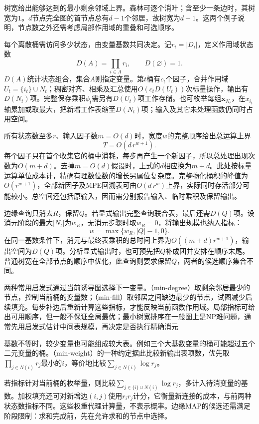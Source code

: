树宽给出能够达到的最小剩余邻域上界。森林可逐个消叶；含至少一条边时，其树宽为$1$。$d$节点完全图的首节点总有$d-1$个邻居，故树宽为$d-1$。这两个例子说明，节点数之外还需考虑局部作用域的重叠和可选顺序。

每个离散桶需访问多少状态，由变量基数共同决定。记$r_i=|D_i|$，定义作用域状态数
\[
  D(A)=\prod_{i\in A}r_i,\qquad D(\varnothing)=1.
\]
$D(A)$统计状态组合，集合$A$则指定变量。第$t$桶有$c_t$个因子，合并作用域$U_t=\{i_t\}\cup N_t$；稠密对齐、相乘及汇总使用$O(c_tD(U_t))$次标量操作，输出有$D(N_t)$项。完整保存乘积$\phi_t$需另有$D(U_t)$项工作存储。也可枚举每组$\bm{x}_{N_t}$，在$x_{i_t}$轴累加或取最大，把新增工作表缩至$D(N_t)$项；输入及其它未处理函数仍同时占用空间。

所有状态数至多$r$、输入因子数$m=O(d)$时，宽度$w$的完整顺序给出总运算上界
\begin{equation}
  T=O(d\,r^{w+1}).
  \label{eq:pgm-elimination-discrete-time}
\end{equation}
每个因子只在首个收集它的桶中消耗，每步再产生一个新因子，所以总处理出现次数为$O(m+d)$。去掉$m=O(d)$假设时，上式的$d$相应换为$m+d$。此处按标量运算单位成本计，精确有理数位数的增长另属位复杂度。完整物化桶积的峰值为$O(r^{w+1})$，全部新因子及MPE回溯表可由$O(d\,r^w)$上界，实际同时存活部分可能较小。总空间还包括原输入，因而需分别报告输入、临时乘积及保留输出。

边缘查询只消去$R$，保留$Q$。若显式输出完整查询联合表，最后还需$D(Q)$项。设消元阶段的最大$|N_t|$为$w_R$，无消元步骤时取$w_R=0$，将输出规模也纳入指标：
\[
  \bar w=\max\{w_R,|Q|-1,0\}.
\]
在同一基数条件下，消元与最终表乘积的总时间上界为$O((m+d)r^{\bar w+1})$，输出空间为$D(Q)$项。分析显式输出时，也可预先把$Q$补成团并安排在顺序末尾。普通树宽在全部节点的顺序中优化，此查询则要求保留$Q$，两者的候选顺序集合不同。

两种常用启发式通过当前诱导图选择下一变量。（min-degree）取剩余邻居最少的节点，控制当前桶的变量数；（min-fill）取邻居之间缺边最少的节点，试图减少后续填充。每步补边后重新计算这些指标，才能反映当前函数作用域。局部指标可给出可用顺序，但一般不保证全局最优；最小树宽排序在一般图上是NP难问题，通常先用启发式估计中间表规模，再决定是否执行精确消元

基数不等时，较少变量也可能组成较大表。例如三个大基数变量的桶可能超过五个二元变量的桶。（min-weight）的一种约定据此比较新输出表项数，优先取$\prod_{j\in N(i)}r_j$最小的$i$，等价地比较$\sum_{j\in N(i)}\log r_j$。

若指标针对当前桶的枚举量，则比较$\sum_{j\in\{i\}\cup N(i)}\log r_j$，多计入待消变量的基数。加权填充还可对新增边$(i,j)$使用$r_ir_j$计分，它衡量新连接的成本，与前两种状态数指标不同。这些权重代理计算量，不表示概率。边缘MAP的候选还需满足阶段限制：求和完成前，先在允许求和的节点中选择。

